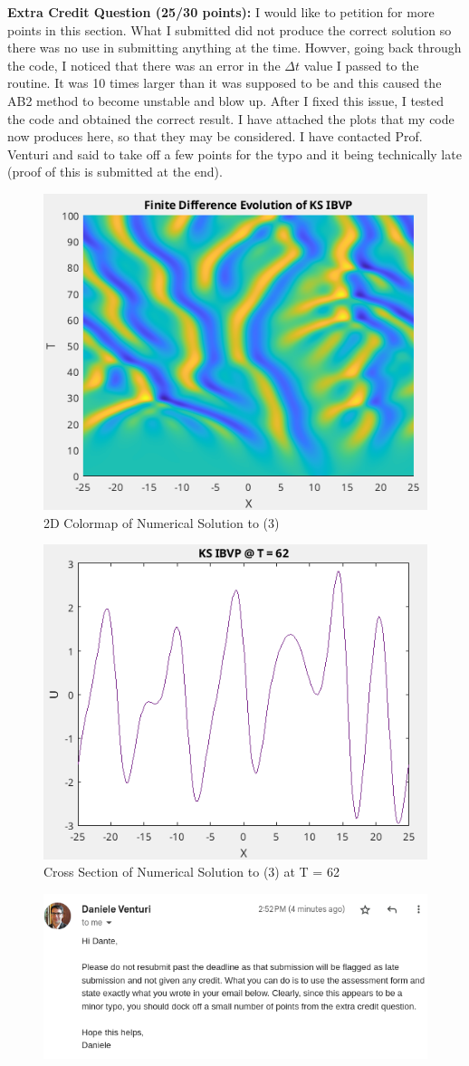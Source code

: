 \documentclass[10pt,english]{article}
\def\vs{\vspace{0.2cm}}
\begin{document}
\vs
{\bf Extra Credit Question (25/30 points):} I would like to petition for more
points in this section. What I submitted did not produce the correct solution so
there was no use in submitting anything at the time. Howver, going back through
the code, I noticed that there was an error in the $\Delta t$ value I passed to the
routine. It was 10 times larger than it was supposed to be and this caused the
AB2 method to become unstable and blow up. After I fixed this issue, I tested
the code and obtained the correct result. I have attached the plots that my code
now produces here, so that they may be considered. I have contacted Prof.
Venturi and said to take off a few points for the typo and it being technically
late (proof of this is submitted at the end).
\begin{figure}[ht]
    \centering
    \includegraphics[width=.5\textwidth]{q3_colormap.png}
    \caption{2D Colormap of Numerical Solution to (3)}
\end{figure}
\begin{figure}[ht]
    \centering
    \includegraphics[width=.5\textwidth]{q3t62.png}
    \caption{Cross Section of Numerical Solution to (3) at T = 62}
\end{figure}
\begin{figure}[ht]
    \centering
    \includegraphics[width=.9\textwidth]{danieleemail.png}
\end{figure}
\end{document}
